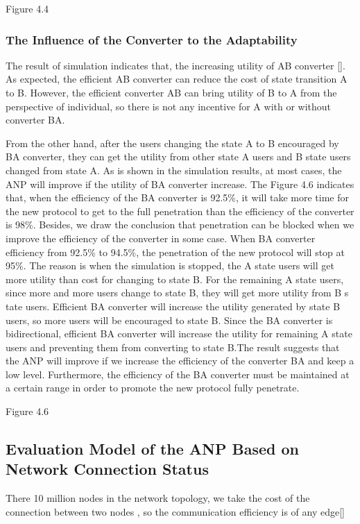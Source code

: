 \documentclass{article}
\begin{document}
Figure 4.4

\subsubsection{The Influence of the Converter to the Adaptability}
The result of simulation indicates that, the increasing utility of AB converter []. As expected, the efficient AB
converter can reduce the cost of state transition A to B. However, the efficient converter AB can bring utility of B to A
from the perspective of individual, so there is not any incentive for A with or without converter BA.

From the other hand, after the users changing the state A to B encouraged by BA converter, they can get the utility from
other state A users and  B state users changed from state A. As is shown in the simulation results, at most cases,
the ANP will improve if the utility of BA converter increase. The Figure 4.6 indicates that, when the efficiency of
the BA converter is 92.5\%, it will take more time for the new protocol to get to the full penetration than the efficiency of
the converter is 98\%. Besides, we draw the conclusion that penetration can be blocked when we improve the efficiency of
the converter in some case. When BA converter efficiency from 92.5\% to 94.5\%,  the penetration of the new protocol will
stop at 95\%. The reason is when the simulation is stopped, the A state users will get more utility than cost for changing
to state B. For the remaining A state users, since more and more users change to state B, they will get more utility from B s
tate users.   Efficient BA converter will increase the utility generated by state B users, so more users will be encouraged to
state B. Since the BA converter is bidirectional, efficient BA converter will increase the utility for remaining A state users
and preventing them from converting to state B.The result suggests that the ANP will improve if we increase the efficiency of
the converter BA and keep a low level. Furthermore, the efficiency of the BA converter must be maintained at a certain range
in order to promote the new protocol fully penetrate.

Figure 4.6

\subsection{Evaluation Model of the ANP Based on Network Connection Status}
There 10 million nodes in the network topology, we take the cost of the connection between two nodes , so the communication
efficiency is of any edge[]
\end{document}
